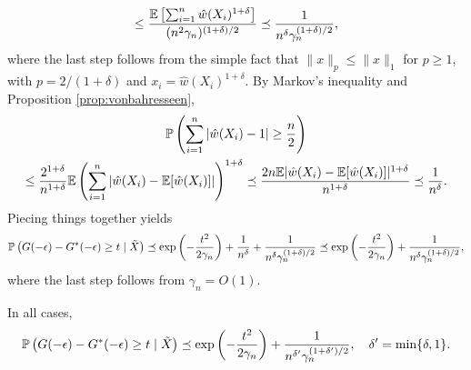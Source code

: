\begin{enumerate}[(1)]
\begin{align*}
  \le \frac{\mathbb{E}\left[\sum_{i=1}^{n}\hat{w}(X_i)^{1 + \delta}\right]}{(n^2\gamma_{n})^{(1 + \delta) / 2}}\preceq \frac{1}{n^{\delta}\gamma_{n}^{(1 + \delta)/2}},
  \end{align*}
  where the last step follows from the simple fact that $\|x\|_{p}\le \|x\|_{1}$ for $p\ge 1$, with $p = 2 / (1 + \delta)$ and $x_i = \hat{w}(X_i)^{1 + \delta}$. By Markov's inequality and Proposition \ref{prop:vonbahresseen},
  \begin{multline}
    \mathbb{P}\left( \sum_{i=1}^{n}|\hat{w}(X_i) - 1|\ge \frac{n}{2}\right) \\
    \le \frac{2^{1 + \delta}}{n^{1 + \delta}}\mathbb{E}\left(\sum_{i=1}^{n}|\hat{w}(X_i) - \mathbb{E}[\hat{w}(X_i)]|\right)^{1 + \delta} \preceq \frac{2n\mathbb{E}|\hat{w}(X_i) - \mathbb{E}[\hat{w}(X_i)]|^{1 + \delta}}{n^{1 + \delta}} \preceq \frac{1}{n^{\delta}}.\label{eq:denom_case2}
  \end{multline}
  Piecing things together yields 
  \[\mathbb{P}\left( G(-\epsilon) - G^{*}(-\epsilon) \ge t \mid \tilde{X}\right)\preceq \exp\left( - \frac{t^2}{2\gamma_{n}}\right) + \frac{1}{n^{\delta}} + \frac{1}{n^{\delta}\gamma_{n}^{(1 + \delta) / 2}} \preceq \exp\left( - \frac{t^2}{2\gamma_{n}}\right) + \frac{1}{n^{\delta}\gamma_{n}^{(1 + \delta) / 2}},\]
  where the last step follows from $\gamma_{n} = O(1)$.
\end{enumerate}
In all cases, 
\begin{equation}
  \label{eq:etaX2}
  \mathbb{P}\left( G(-\epsilon) - G^{*}(-\epsilon) \ge t \mid \tilde{X}\right)\preceq 
\exp\left( - \frac{t^2}{2\gamma_{n}}\right) + \frac{1}{n^{\delta'}\gamma_{n}^{(1 + \delta') / 2}}, \quad \delta' = \min\{\delta, 1\}.
\end{equation}

